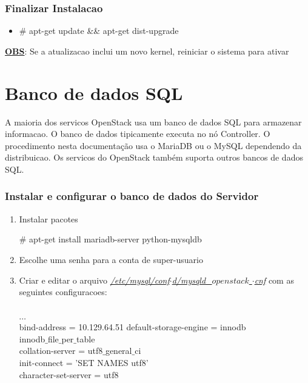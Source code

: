 \documentclass[a4paper]{book}
\begin{document}
				\subsubsection{Finalizar Instalacao}
				\begin{itemize}
					\item \# apt-get update \&\& apt-get dist-upgrade
				\end{itemize}
				\underline{\textbf{OBS}}: Se a atualizacao inclui um novo kernel, reiniciar o sistema para ativar
		
		
		\section{Banco de dados SQL}
		A maioria dos servicos OpenStack usa um banco de dados SQL para armazenar informacao. O banco de dados tipicamente executa no nó Controller. O procedimento nesta documentação usa o MariaDB ou o MySQL dependendo da distribuicao. Os servicos do OpenStack também suporta outros bancos de dados SQL.
		
		\subsubsection{Instalar e configurar o banco de dados do Servidor}		
		\begin{enumerate}
			\item Instalar pacotes
			\begin{snugshade}
			\# apt-get install mariadb-server python-mysqldb
			\end{snugshade}			
			
			\item Escolhe uma senha para a conta de super-usuario
			
			\item Criar e editar o arquivo \emph{\underline{/etc/mysql/conf$\cdot$d/mysqld\_$openstack$ $\cdot$cnf}} com as seguintes configuracoes:
			\begin{snugshade}
				[mysqld] \\
				$\cdots$ \\
				bind-address = 10.129.64.51
				default-storage-engine = innodb \\
				innodb$\_$file$\_$per$\_$table  \\
				collation-server = utf8$\_$general$\_$ci\\
				init-connect = 'SET NAMES utf8'\\
				character-set-server = utf8
			\end{snugshade}
			\end{enumerate}
\end{document}
